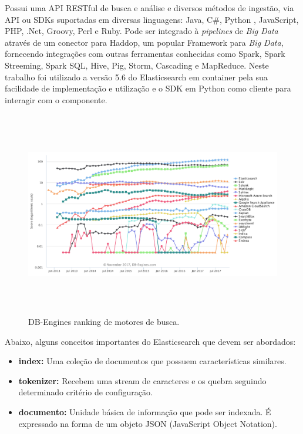 \documentclass[12pt,a4paper]{article}
\begin{document}
Possui uma API RESTful de busca e análise e diversos métodos de ingestão, via API ou SDKs suportadas em diversas linguagens:
 Java, C\#, Python , JavaScript, PHP, .Net, Groovy, Perl e Ruby. Pode ser integrado à \textit{pipelines} de \textit{Big Data} através
 de um conector para Haddop, um popular Framework para \textit{Big Data}, fornecendo integrações com outras ferramentas conhecidas como Spark, Spark Streeming, Spark SQL,
 Hive, Pig, Storm, Cascading e MapReduce. Neste trabalho foi utilizado a versão 5.6 do Elasticsearch em container pela sua facilidade de implementação e utilização e o SDK em Python como cliente para interagir com o componente. 

\begin{figure}[H]
	\centering
  \includegraphics[height=9cm]{images/figure_12.png}
  \caption{DB-Engines ranking de motores de busca. \cite{db-engines}}
  \label{fig-search-ranking}
\end{figure}

Abaixo, alguns conceitos importantes do Elasticsearch que devem ser abordados:

 \begin{itemize}
   \item \textbf{index:} Uma coleção de documentos que possuem características similares.
   \item \textbf{tokenizer:} Recebem uma stream de caracteres e os quebra seguindo determinado critério de configuração.
   \item \textbf{documento:} Unidade básica de informação que pode ser indexada. É expressado na forma de um objeto JSON (JavaScript Object Notation).
 \end{itemize}
\end{document}

